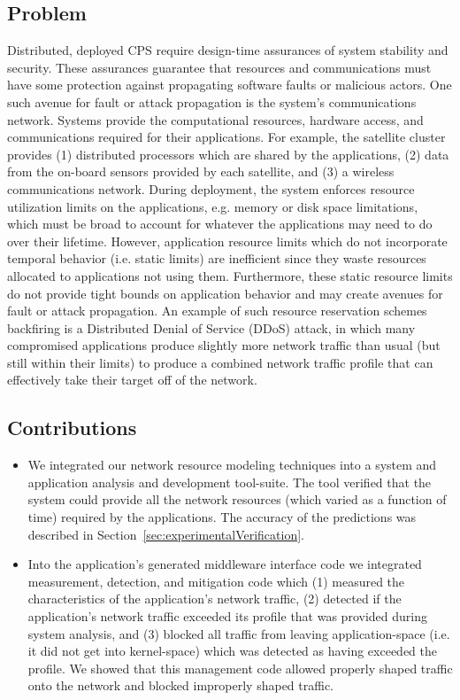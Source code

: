 \subsection{Problem}
Distributed, deployed CPS require design-time assurances of system
stability and security.  These assurances guarantee that resources and
communications must have some protection against propagating software
faults or malicious actors.  One such avenue for fault or attack
propagation is the system's communications network.  Systems provide
the computational resources, hardware access, and communications
required for their applications.  For example, the satellite cluster
provides (1) distributed processors which are shared by the
applications, (2) data from the on-board sensors provided by each
satellite, and (3) a wireless communications network.  During
deployment, the system enforces resource utilization limits on the
applications, e.g. memory or disk space limitations, which must be
broad to account for whatever the applications may need to do over
their lifetime.  However, application resource limits which do not
incorporate temporal behavior (i.e. static limits) are inefficient
since they waste resources allocated to applications not using them.
Furthermore, these static resource limits do not provide tight bounds
on application behavior and may create avenues for fault or attack
propagation.  An example of such resource reservation schemes
backfiring is a Distributed Denial of Service (DDoS) attack, in which
many compromised applications produce slightly more network traffic
than usual (but still within their limits) to produce a combined
network traffic profile that can effectively take their target off of
the network.

\subsection{Contributions}
\begin{itemize}
	\item We integrated our network resource modeling techniques
          into a system and application analysis and development
          tool-suite. The tool verified that the system could provide
          all the network resources (which varied as a function of
          time) required by the applications.  The accuracy of the
          predictions was described in
          Section~\ref{sec:experimentalVerification}.
	\item Into the application's generated middleware interface
          code we integrated measurement, detection, and mitigation
          code which (1) measured the characteristics of the
          application's network traffic, (2) detected if the
          application's network traffic exceeded its profile that was
          provided during system analysis, and (3) blocked all traffic
          from leaving application-space (i.e. it did not get into
          kernel-space) which was detected as having exceeded the
          profile.  We showed that this management code allowed
          properly shaped traffic onto the network and blocked
          improperly shaped traffic.
\end{itemize}

